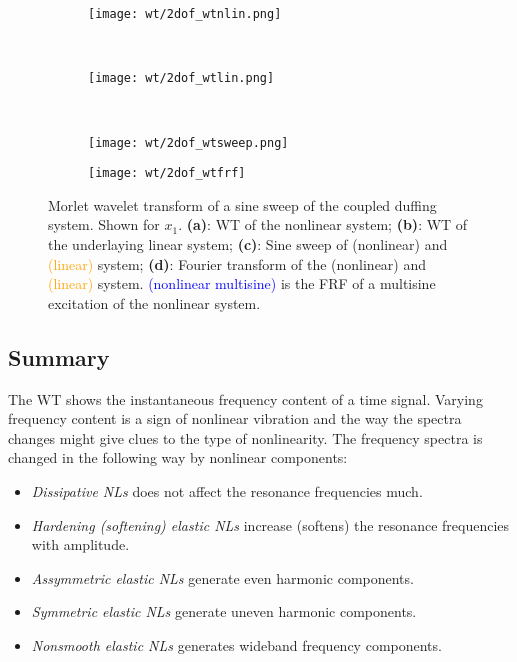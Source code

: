 \begin{figure}[!ht]
  \centering
  \begin{subfigure}[b]{0.48\textwidth}
    \texttt{[image: wt/2dof\_wtnlin.png]}
    \caption{}
  \end{subfigure}
  ~
  \begin{subfigure}[b]{0.48\textwidth}
    \texttt{[image: wt/2dof\_wtlin.png]}
    \caption{}
  \end{subfigure}
  \\
  \begin{subfigure}[b]{0.49\textwidth}
    \texttt{[image: wt/2dof\_wtsweep.png]}
    \caption{}
  \end{subfigure}
  \begin{subfigure}[b]{0.49\textwidth}
    \texttt{[image: wt/2dof\_wtfrf]}
    \caption{}
  \end{subfigure}
  \caption{Morlet wavelet transform of a sine sweep of the coupled duffing
    system. Shown for $x_1$.
    \textbf{(a)}: WT of the nonlinear system;
    \textbf{(b)}: WT of the underlaying linear system;
    \textbf{(c)}: Sine sweep of
    \sampleline{}(nonlinear) and
    \textcolor{orange}{(linear)} system;
    \textbf{(d)}: Fourier transform of the
    \sampleline{}(nonlinear) and
    \textcolor{orange}{(linear)} system.
    \textcolor{blue}{\sampleline{}(nonlinear multisine)} is the FRF of a
    multisine excitation of the nonlinear system.
  }
  \label{fig:mw_2dof}
\end{figure}


\subsection{Summary}
\label{sec:wt_transform}

The WT shows the instantaneous frequency content of a time signal. Varying
frequency content is a sign of nonlinear vibration and the way the spectra
changes might give clues to the type of nonlinearity.
The frequency spectra is changed in the following way by nonlinear components:

\begin{itemize}
\item \textit{Dissipative NLs} does not affect the resonance frequencies much.
\item \textit{Hardening (softening) elastic NLs} increase (softens) the resonance
  frequencies with amplitude.
\item \textit{Assymmetric elastic NLs} generate even harmonic components.
\item \textit{Symmetric elastic NLs} generate uneven harmonic components.
\item \textit{Nonsmooth elastic NLs} generates wideband frequency components.
\end{itemize}

